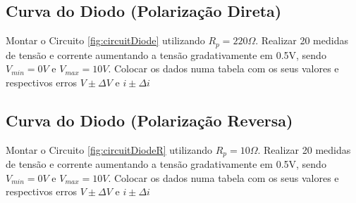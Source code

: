 \documentclass{article}
\begin{document}
        \subsection{Curva do Diodo (Polarização Direta)}
            Montar o Circuito \ref{fig:circuitDiode} 
            utilizando $R_p = 220\Omega$.
            \newline
            Realizar 20 medidas de tensão e corrente aumentando 
            a tensão gradativamente em 0.5V, sendo $V_{min}=0V$ e $V_{max}=10V$. 
            \newline
            Colocar os dados numa tabela com os seus valores e respectivos erros $V\pm\Delta V$
            e $i\pm\Delta i$
        \subsection{Curva do Diodo (Polarização Reversa)}
            Montar o Circuito \ref{fig:circuitDiodeR} 
            utilizando $R_p = 10\Omega$.
            \newline
            Realizar 20 medidas de tensão e corrente aumentando 
            a tensão gradativamente em 0.5V, sendo $V_{min}=0V$ e $V_{max}=10V$. 
            \newline
            Colocar os dados numa tabela com os seus valores e respectivos erros 
            $V\pm\Delta V$ e $i\pm\Delta i$
\end{document}
